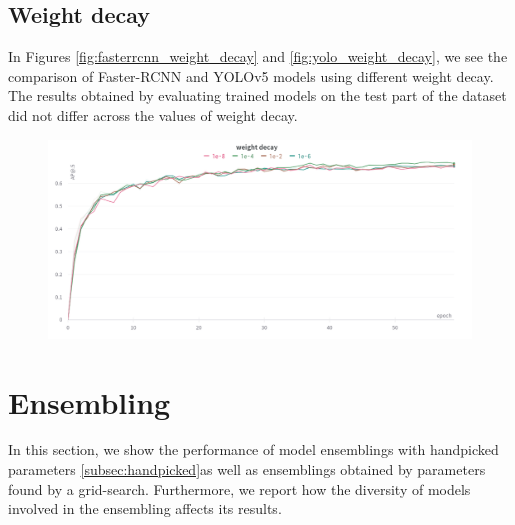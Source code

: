 \subsection{Weight decay}
In Figures \ref{fig:fasterrcnn_weight_decay} and \ref{fig:yolo_weight_decay}, we see the comparison of Faster-RCNN and YOLOv5 models using different weight decay. The results obtained by evaluating trained models on the test part of the dataset did not differ across the values of weight decay.
\begin{figure}[H]
    \begin{floatrow}[2]
        { \includegraphics[width=\linewidth]{images/weight_decay_yolo.png} }
    \end{floatrow}
\end{figure}

\section{Ensembling}
\label{sec:ensembling_results}
In this section, we show the performance of model ensemblings with handpicked parameters \ref{subsec:handpicked}as well as ensemblings obtained by parameters found by a grid-search. Furthermore, we report how the diversity of models involved in the ensembling affects its results.

